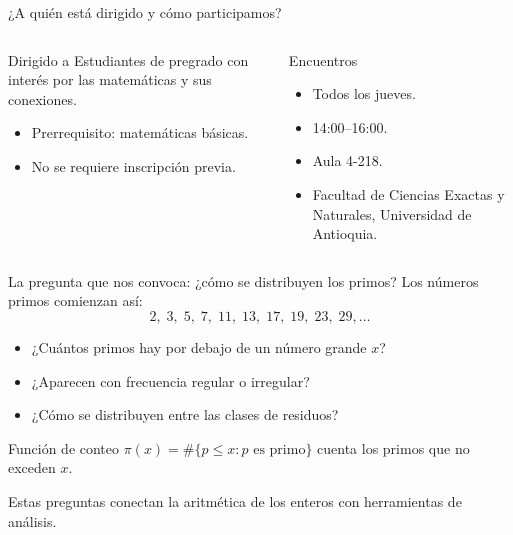 \documentclass[aspectratio=169,11pt]{beamer}
\begin{document}
\begin{frame}{¿A quién está dirigido y cómo participamos?}
    \begin{columns}[T,onlytextwidth]
        \begin{block}{Dirigido a}
            Estudiantes de pregrado con interés por las matemáticas y sus conexiones.
            \begin{itemize}
                \item Prerrequisito: matemáticas básicas.
                \item No se requiere inscripción previa.
            \end{itemize}
        \end{block}
        \begin{exampleblock}{Encuentros}
            \begin{itemize}
                \item Todos los jueves.
                \item 14:00--16:00.
                \item Aula 4-218.
                \item Facultad de Ciencias Exactas y Naturales, Universidad de Antioquia.
            \end{itemize}
        \end{exampleblock}
    \end{columns}
\end{frame}

\begin{frame}{La pregunta que nos convoca: ¿cómo se distribuyen los primos?}
    Los números primos comienzan así:
    \[
      2,\;3,\;5,\;7,\;11,\;13,\;17,\;19,\;23,\;29,\ldots
    \]
    \begin{itemize}
        \item ¿Cuántos primos hay por debajo de un número grande $x$?
        \item ¿Aparecen con frecuencia regular o irregular?
        \item ¿Cómo se distribuyen entre las clases de residuos?
    \end{itemize}
    \begin{block}{Función de conteo}
        $\pi(x)=\#\{p\leq x:p\text{ es primo}\}$ cuenta los primos que no exceden $x$.
    \end{block}
    \centering\small Estas preguntas conectan la aritmética de los enteros con herramientas de análisis.\;\cite[Capítulos 1--2]{Apostol1976-xj}
\end{frame}
\end{document}
